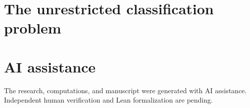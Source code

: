 \documentclass[11pt]{article}
\begin{document}
\section{The unrestricted classification problem}


\section*{AI assistance}
The research, computations, and manuscript were generated with AI assistance. Independent human verification and Lean formalization are pending.
\begingroup\small

\endgroup
\end{document}
